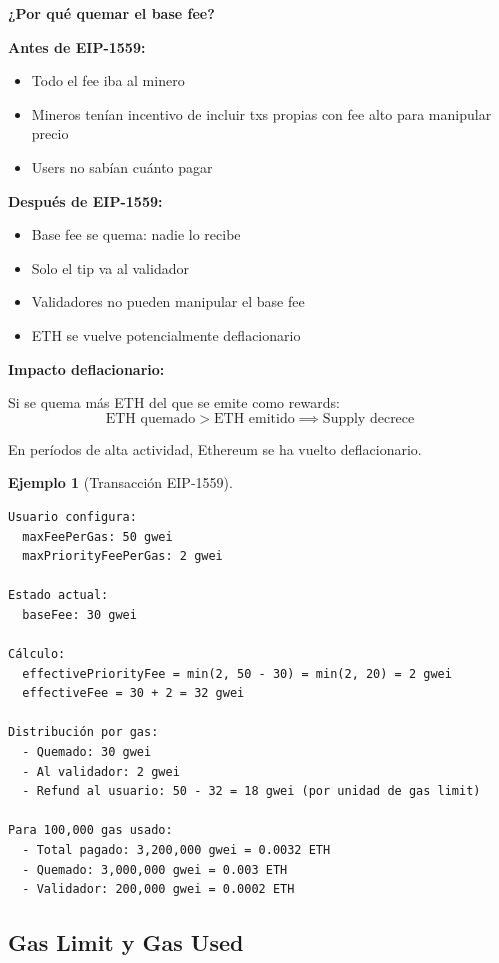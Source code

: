 \documentclass[11pt,a4paper,twoside,openright]{book}
\theoremstyle{definition}
\newtheorem{example}{Ejemplo}[chapter]
\theoremstyle{plain}
\theoremstyle{remark}
\begin{document}
\begin{keyidea}
\textbf{¿Por qué quemar el base fee?}

\textbf{Antes de EIP-1559:}
\begin{itemize}
    \item Todo el fee iba al minero
    \item Mineros tenían incentivo de incluir txs propias con fee alto para manipular precio
    \item Users no sabían cuánto pagar
\end{itemize}

\textbf{Después de EIP-1559:}
\begin{itemize}
    \item Base fee se quema: nadie lo recibe
    \item Solo el tip va al validador
    \item Validadores no pueden manipular el base fee
    \item ETH se vuelve potencialmente deflacionario
\end{itemize}

\textbf{Impacto deflacionario:}

Si se quema más ETH del que se emite como rewards:
\[ \text{ETH quemado} > \text{ETH emitido} \implies \text{Supply decrece} \]

En períodos de alta actividad, Ethereum se ha vuelto deflacionario.
\end{keyidea}

\begin{example}[Transacción EIP-1559]
\begin{verbatim}
Usuario configura:
  maxFeePerGas: 50 gwei
  maxPriorityFeePerGas: 2 gwei

Estado actual:
  baseFee: 30 gwei

Cálculo:
  effectivePriorityFee = min(2, 50 - 30) = min(2, 20) = 2 gwei
  effectiveFee = 30 + 2 = 32 gwei

Distribución por gas:
  - Quemado: 30 gwei
  - Al validador: 2 gwei
  - Refund al usuario: 50 - 32 = 18 gwei (por unidad de gas limit)

Para 100,000 gas usado:
  - Total pagado: 3,200,000 gwei = 0.0032 ETH
  - Quemado: 3,000,000 gwei = 0.003 ETH
  - Validador: 200,000 gwei = 0.0002 ETH
\end{verbatim}
\end{example}

\subsection{Gas Limit y Gas Used}
\end{document}
